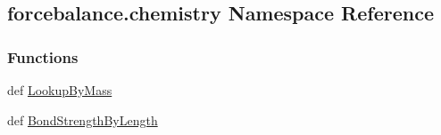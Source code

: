 \hypertarget{namespaceforcebalance_1_1chemistry}{\subsection{forcebalance.\-chemistry Namespace Reference}
\label{namespaceforcebalance_1_1chemistry}
}
\subsubsection*{Functions}
\begin{DoxyCompactItemize}
\item 
def \hyperlink{namespaceforcebalance_1_1chemistry_a7f1904563d4cc7623dcc4fdab5c645a0}{Lookup\-By\-Mass}
\item 
def \hyperlink{namespaceforcebalance_1_1chemistry_a843280e0ccfc3059271008be88b38a42}{Bond\-Strength\-By\-Length}
\end{DoxyCompactItemize}
